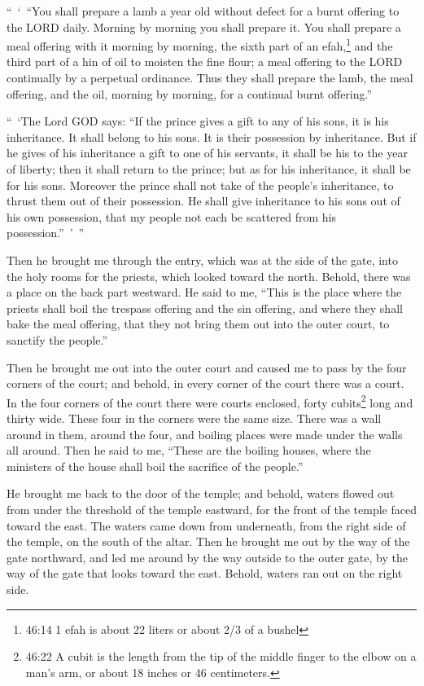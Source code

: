 \myverse{}“ ‘ “You shall prepare a lamb a year old without defect for a
burnt offering to the LORD daily. Morning by morning you shall prepare it.
\myverse{}You shall prepare a meal offering with it morning by morning, the sixth part
of an efah,\footnote{46:14 1 efah is about 22 liters or about 2/3 of a bushel} and the third part of a hin of oil
to moisten the fine flour; a meal offering to the LORD continually by a perpetual ordinance.
\myverse{}Thus they shall prepare the lamb, the meal offering, and the oil, morning
by morning, for a continual burnt offering.”

\myverse{}“ ‘The Lord GOD says: “If the prince gives a gift to any of his
sons, it is his inheritance. It shall belong to his sons. It is their possession by inheritance.
\myverse{}But if he gives of his inheritance a gift to one of his servants, it shall
be his to the year of liberty; then it shall return to the prince; but as for his inheritance, it shall
be for his sons.
\myverse{}Moreover the prince shall not take of the people’s inheritance, to thrust
them out of their possession. He shall give inheritance to his sons out of his own possession, that my
people not each be scattered from his possession.” ’ ”

\myverse{}Then he brought me through the entry, which was at the side
of the gate, into the holy rooms for the priests, which looked toward the north. Behold, there was a place
on the back part westward.
\myverse{}He said to me, “This is the place where the priests shall boil the trespass
offering and the sin offering, and where they shall bake the meal offering, that they not bring them out
into the outer court, to sanctify the people.”

\myverse{}Then he brought me out into the outer court and caused me to
pass by the four corners of the court; and behold, in every corner of the court there was a court.
\myverse{}In the four corners of the court there were courts enclosed, forty cubits\footnote{46:22 A cubit is the length from the tip of the middle finger to the elbow on a man’s arm, or about
	18 inches or 46 centimeters.} long and thirty wide. These four in the corners were the same size.
\myverse{}There was a wall around in them, around the four, and boiling places were
made under the walls all around.
\myverse{}Then he said to me, “These are the boiling houses, where the ministers of
the house shall boil the sacrifice of the people.”


\mychapter{} \myverse*{}He brought me back to the door of the temple; and behold, waters
flowed out from under the threshold of the temple eastward, for the front of the temple faced toward the
east. The waters came down from underneath, from the right side of the temple, on the south of the altar.
\myverse{}Then he brought me out by the way of the gate northward, and led me around
by the way outside to the outer gate, by the way of the gate that looks toward the east. Behold, waters
ran out on the right side.

